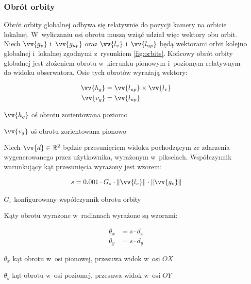 \subsubsection{Obrót orbity}

Obrót orbity globalnej odbywa się relatywnie do pozycji kamery na orbicie lokalnej. W~wyliczaniu osi obrotu muszą wziąć udział więc wektory obu orbit. Niech $\vv{g_{v}}$ i~$\vv{g_{up}}$ oraz $\vv{l_{v}}$ i~$\vv{l_{up}}$ będą wektorami orbit kolejno globalnej i~lokalnej zgodnymi z~rysunkiem \ref{fig:orbits}. Końcowy obrót orbity globalnej jest złożeniem obrotu w~kierunku pionowym i~poziomym relatywnym do widoku obserwatora. Osie tych obrotów wyrażają wektory:

\begin{samepage}
    \begin{align}
        \label{eq:o_1}
        \vv{h_g} &= \vv{l_{up}} \times \vv {l_{v}}\\
        \vv{v_g} &= \vv{l_{up}}
    \end{align}
    \begin{eqexpl}[25mm]
        \item {$\vv{h_g}$} oś obrotu zorientowana poziomo
        \item {$\vv{v_g}$} oś obrotu zorientowana pionowo
    \end{eqexpl}
    \vspace{\baselineskip}
\end{samepage}

Niech $\vv{d} \in \mathbb{R}^2 $ będzie przesunięciem widoku pochodzącym ze zdarzenia wygenerowanego przez użytkownika, wyrażonym w~pikselach. Współczynnik warunkujący kąt przesunięcia wyrażony jest wzorem:
\begin{samepage}
    \begin{equation}
        \label{eq:o_2}
        s = 0.001 \cdot G_s \cdot \Vert\vv{l_v}\Vert \cdot \Vert\vv{g_v}\Vert
    \end{equation}
    \begin{eqexpl}[25mm]
        \item {$G_s$} konfigurowany współczynnik obrotu orbity 
    \end{eqexpl}
    \vspace{\baselineskip}
\end{samepage}

Kąty obrotu wyrażone w~radianach wyrażone są wzorami:
\begin{samepage}
    \begin{align}
        \label{eq:o_3}
        \theta_x &= s \cdot d_x \\
        \theta_y &= s \cdot d_y
    \end{align}
    \begin{eqexpl}[25mm]
        \item {$\theta_x$} kąt obrotu w~osi pionowej, przesuwa widok w~osi $OX$
        \item {$\theta_y$} kąt obrotu w~osi poziomej, przesuwa widok w~osi $OY$
    \end{eqexpl}
    \vspace{\baselineskip}
\end{samepage}

